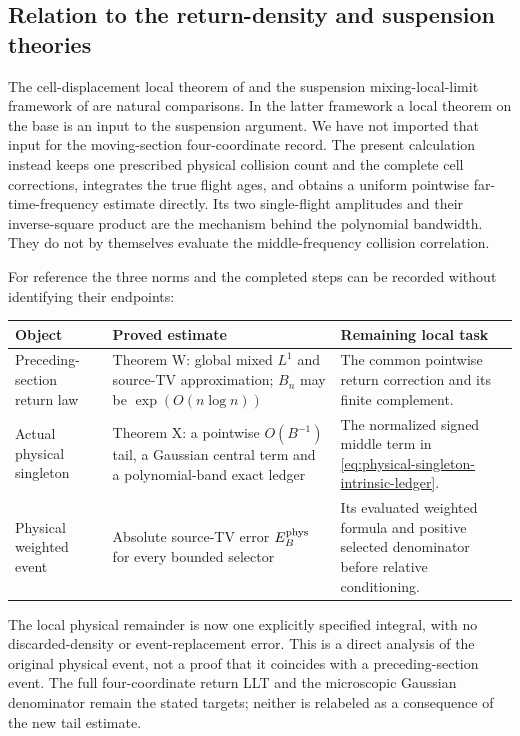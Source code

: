 \subsection{Relation to the return-density and suspension theories}
The cell-displacement local theorem of \cite{SV} and the suspension
mixing-local-limit framework of \cite[Definition 2.2 and Section 2.4]{DN}
are natural comparisons. In the latter framework a local theorem on
the base is an input to the suspension argument. We have not imported
that input for the moving-section four-coordinate record. The present
calculation instead keeps one prescribed physical collision count and
the complete cell corrections, integrates the true flight ages, and
obtains a uniform pointwise far-time-frequency estimate directly.
Its two single-flight amplitudes and their inverse-square product
are the mechanism behind the polynomial bandwidth. They do not by
themselves evaluate the middle-frequency collision correlation.

For reference the three norms and the completed steps can be recorded
without identifying their endpoints:
\begin{center}
\small
\renewcommand{\arraystretch}{1.15}
\begin{tabular}{@{}p{}p{}p{}@{}}
\hline
Object & Proved estimate & Remaining local task\\
\hline
Preceding-section return law & Theorem W: global mixed $L^1$ and
source-TV approximation; $B_n$ may be $\exp(O(n\log n))$ & The common
pointwise return correction and its finite complement.\\
Actual physical singleton & Theorem X: a pointwise $O(B^{-1})$ tail,
a Gaussian central term and a polynomial-band exact ledger & The
normalized signed middle term in
\eqref{eq:physical-singleton-intrinsic-ledger}.\\
Physical weighted event & Absolute source-TV error $E_B^{\rm phys}$
for every bounded selector & Its evaluated weighted formula and positive
selected denominator before relative conditioning.\\
\hline
\end{tabular}
\end{center}
The local physical remainder is now one explicitly specified integral,
with no discarded-density or event-replacement error. This is a direct
analysis of the original physical event, not a proof that it coincides
with a preceding-section event. The full four-coordinate return LLT
and the microscopic Gaussian denominator remain the stated targets;
neither is relabeled as a consequence of the new tail estimate.
